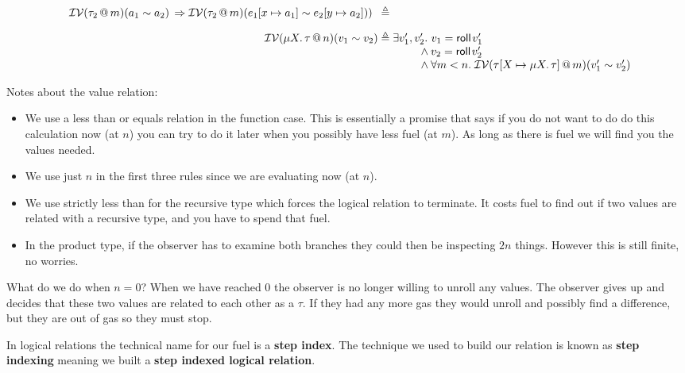 \documentclass{lecturenotes}
\makeatletter
\newcommand{\spa}{\mkern5mu}
\newcommand{\inval}[4]{\ensuremath{\mathcal{I}\mathcal{V}(#1 \mkern3mu @ \mkern3mu #2)(#3 \sim #4})}
\newcommand{\rectype}[2]{\ensuremath{\mu #1.\,#2}}
\newcommand{\roll}[1]{\textsf{roll}\mkern2mu#1}
\makeatother
\begin{document}
$$\begin{array}{r@{\;\triangleq\;}l}
\begin{array}[t]{l}
      {} \hspace{.35em}\inval{\tau_2}{m}{a_1}{a_2}\, \Rightarrow \inval{\tau_2}{m}{e_1[x \mapsto a_1]}{e_2[y \mapsto a_2]})
    \end{array}
  \\[1em]
  \inval{\rectype{X}{\tau}}{n}{v_1}{v_2} 
    & \exists v_1', v_2'.\, \hspace{-1.5em}
    \begin{array}[t]{l}\hspace{1.15em}
      v_1 = \roll{v_1'}\\
      {} \land v_2 = \roll{v_2'}\\ 
      {} \land \forall m < n. \spa \inval{\tau[X \mapsto \rectype{X}{\tau}]}{m}{v_1'}{v_2'}\\
    \end{array}  
  \\
\end{array}$$

Notes about the value relation: 
\begin{itemize}
  \item We use a less than or equals relation in the function case. 
    This is essentially a promise that says if you do not want to do do this calculation now (at $n$) you can try to do it later when you possibly have less fuel (at $m$). 
    As long as there is fuel we will find you the values needed. 
  \item We use just $n$ in the first three rules since we are evaluating now (at $n$). 
  \item We use strictly less than for the recursive type which forces the logical relation to terminate. 
    It costs fuel to find out if two values are related with a recursive type, and you have to spend that fuel. 
  \item In the product type, if the observer has to examine both branches they could then be inspecting $2n$ things. 
  However this is still finite, no worries. 
\end{itemize}

What do we do when $n= 0$? 
  When we have reached $0$ the observer is no longer willing to unroll any values. 
  The observer gives up and decides that these two values are related to each other as a $\tau$.
  If they had any more gas they would unroll and possibly find a difference, but they are out of gas so they must stop. 

In logical relations the technical name for our fuel is a \textbf{step index}. 
  The technique we used to build our relation is known as \textbf{step indexing} meaning we built a \textbf{step indexed logical relation}.
\end{document}
